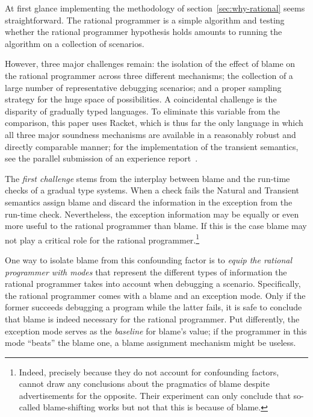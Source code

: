 
At first glance implementing the methodology of
section~\ref{sec:why-rational} seems straightforward. The rational
programmer is a simple algorithm and testing whether the rational
programmer hypothesis holds amounts to running the algorithm on a
collection of scenarios. 

However, three major challenges remain:  the isolation of the effect of
blame on the rational programmer across three different mechanisms; the
collection of a large number of representative debugging scenarios;  and a
proper sampling strategy for the huge space of possibilities. A
coincidental challenge is the disparity of gradually typed languages. To
eliminate this variable from the comparison, this paper uses Racket, which
is thus far the only language in which all three major soundness
mechanisms are available in a reasonably robust and directly comparable
manner; for the implementation of the transient semantics, see the
parallel submission of an experience report~\cite{ttt21}.

The {\em first challenge\/} stems from the interplay between blame and the
run-time checks of a gradual type systems. When a check fails the Natural
and Transient semantics assign blame and discard  the information in the
exception from the run-time check. Nevertheless, the exception
information may be equally or even more useful to the rational programmer
than blame. If this is the case blame may not play a critical role for the
rational programmer.\footnote{Indeed, precisely because they do not
account for confounding factors, ~\citet{lksfd-popl-2020} cannot draw any
conclusions about the pragmatics of blame despite advertisements for the
opposite. Their experiment can only conclude that so-called blame-shifting
works but not that this is because of blame.}  

One way to isolate blame from this confounding factor is to {\em equip the
rational programmer with modes \/} that represent the different types of
information the rational programmer takes into account when debugging a
scenario. Specifically, the rational programmer comes with a blame and
an exception mode. Only if the former succeeds debugging a program while
the latter fails, it is safe to conclude that blame is indeed necessary
for the rational programmer. Put differently, the exception mode serves as
the {\em baseline\/} for blame's value; if the programmer in this mode
``beats'' the  blame one, a blame assignment mechanism might be useless.

